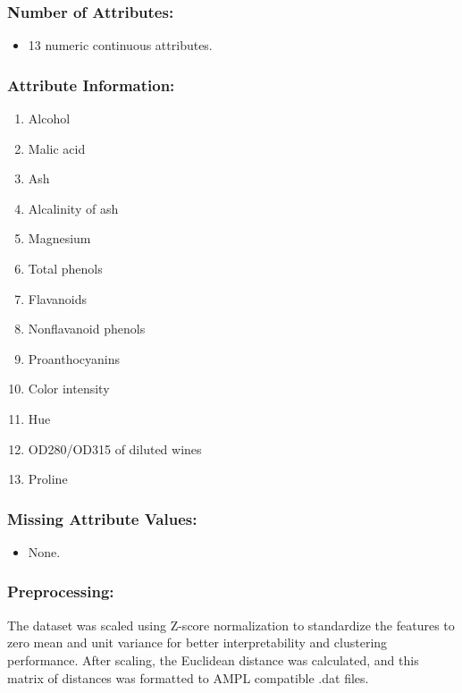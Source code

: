 \documentclass[
]{article}
\providecommand{\tightlist}{%
  \setlength{\itemsep}{0pt}\setlength{\parskip}{0pt}}
\begin{document}
\subsubsection{Number of Attributes:}\label{number-of-attributes}

\begin{itemize}
\tightlist
\item
  13 numeric continuous attributes.
\end{itemize}

\subsubsection{Attribute Information:}\label{attribute-information}

\begin{enumerate}
\def\labelenumi{\arabic{enumi}.}
\tightlist
\item
  Alcohol
\item
  Malic acid
\item
  Ash
\item
  Alcalinity of ash
\item
  Magnesium
\item
  Total phenols
\item
  Flavanoids
\item
  Nonflavanoid phenols
\item
  Proanthocyanins
\item
  Color intensity
\item
  Hue
\item
  OD280/OD315 of diluted wines
\item
  Proline
\end{enumerate}

\subsubsection{Missing Attribute
Values:}\label{missing-attribute-values}

\begin{itemize}
\tightlist
\item
  None.
\end{itemize}

\subsubsection{Preprocessing:}\label{preprocessing}

The dataset was scaled using Z-score normalization to standardize the
features to zero mean and unit variance for better interpretability and
clustering performance. After scaling, the Euclidean distance was
calculated, and this matrix of distances was formatted to AMPL
compatible .dat files.
\end{document}

